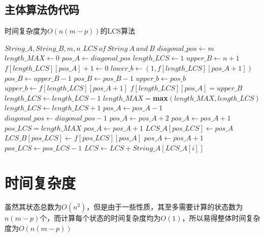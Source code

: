 \subsection{主体算法伪代码}
\vspace{0.6cm}
\begin{breakablealgorithm}
    \caption{时间复杂度为$O(n(m-p))$的LCS算法}
    \begin{algorithmic}[1]
        \Require $String\_A, String\_B,m,n$
        \Ensure $LCS\ of\ String\ A\ and\ B$
            \State $diagonal\_pos \gets m$
            \State $length\_MAX \gets 0$
                \State $pos\_A \gets diagonal\_pos$
                \State $length\_LCS \gets 1$
                \State $upper\_B \gets n+1$
                        \State $f[length\_LCS][pos\_A]+1\gets 0$
                    \EndIf
                    \State $lower\_b\gets$$(1,f[length\_LCS][pos\_A+1])$
                    \State $pos\_B\gets upper\_B-1$
                        \State $pos\_B\gets pos\_B-1$
                    \EndWhile
                        \State $upper\_b\gets pos\_b$
                    \Else
                        \State $upper\_b\gets f[length\_LCS][pos\_A+1]$
                    \EndIf
                    \State $f[length\_LCS][pos\_A]=upper\_B$
                        \State $length\_LCS\gets length\_LCS-1$
                    \EndIf
                    \State $length\_MAX=$\textbf{max}$(length\_MAX,length\_LCS)$
                    \State $length\_LCS\gets length\_LCS+1$
                    \State $pos\_A\gets pos\_A-1$
                \EndWhile
                \State $diagonal\_pos\gets diagonal\_pos-1$
            \EndWhile
                \State $pos\_A\gets pos\_A+2$
            \Else
                \State $pos\_A\gets pos\_A+1$
            \EndIf
        \EndFunction
            \State $pos\_LCS=length\_MAX$
                    \State $pos\_A\gets pos\_A+1$
                \EndWhile
                \State $LCS\_A[pos\_LCS]\gets pos\_A$
                \State $LCS\_B[pos\_LCS]\gets f[pos\_LCS][pos\_A]$
                \State $pos\_A\gets pos\_A+1$
                \State $pos\_LCS\gets pos\_LCS-1$
            \EndWhile
                \State $LCS\gets LCS+String\_A[LCS\_A[i]]$
            \EndFor
        \EndFunction
    \end{algorithmic}
\end{breakablealgorithm}

\section{时间复杂度}
虽然其状态总数为$O(n^2)$，但是由于一些性质，其至多需要计算的状态数为$n(m-p)$个，而计算每个状态的时间复杂度均为$O(1)$，所以易得整体时间复杂度为$O(n(m-p))$
